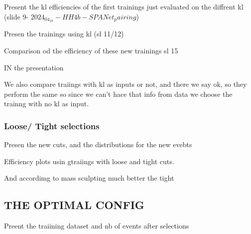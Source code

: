 Present the kl efficiencies of the first trainings just evaluated on the diffrent 
kl (slide 9- $2024_04_18-HH4b-SPANet_pairing$)

Presen the trainings using kl (sl 11/12)

Comparison od the efficiency of these new trainings sl 15


IN the presentation



We also compare traiings with kl as inputs or not, and there we say ok, so they perform the same so since we can't hace that info from data we choose the trainng with no kl as input.

\subsubsection{Loose/ Tight selections}

Presen the new cuts, and the distributions for the new evebts

Efficiency plots usin gtraiings with loose and tight cuts.

And accordimg to mass sculpting much better the tight


\subsection{THE OPTIMAL CONFIG}



Preent the traiining dataset and nb of events after selections